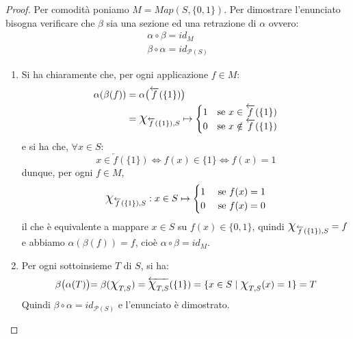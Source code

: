 \begin{proof}
	Per comodità poniamo $M=Map(S,\{0,1\})$. Per dimostrare l'enunciato bisogna verificare che $\beta$ sia una sezione ed una retrazione di $\alpha$ ovvero:
	\begin{displaymath}
		\begin{array}{l}
			\alpha \circ \beta = id_{M}\\
			\beta \circ \alpha = id_{\mathcal{P}(S)}
		\end{array}
	\end{displaymath}
	\begin{enumerate}
		\item Si ha chiaramente che, per ogni applicazione $f \in M$:
		\begin{align*}
			\alpha(\beta(f)) &=\alpha\bigl(\overleftarrow{f}(\{1\})\bigl) \\
			& = \mbox{\Large$\chi$}_{\overleftarrow{f}(\{1\}),S} \mapsto \begin{cases}
				1 & \text{se } x \in \overleftarrow{f}(\{1\})\\
				0 & \text{se } x \notin \overleftarrow{f}(\{1\})
			\end{cases}
		\end{align*}
		e si ha che, $\forall x \in S$:
		\begin{displaymath}
			x \in \overleftarrow{f}(\{1\}) \iff f(x) \in \{1\} \iff f(x)=1
		\end{displaymath}
		dunque, per ogni $f \in M$,
		\[\mbox{\Large$\chi$}_{\overleftarrow{f}(\{1\}),S}: x \in S \mapsto \begin{cases}
			1 & \text{ se } f(x) = 1 \\
			0 & \text{ se } f(x) = 0 \\
		\end{cases}
		\]
		il che è equivalente a mappare $x \in S$ su $f(x) \in \{0,1\}$, quindi $\mbox{\Large$\chi$}_{\overleftarrow{f}(\{1\}),S} = f$ e abbiamo $\alpha(\beta(f)) = f$, cioè $\alpha \circ \beta= id_{M}$.
		\item Per ogni sottoinsieme $T$ di $S$, si ha:
		\begin{align*}
			\beta\bigl(\alpha(T)\bigl) = \beta(\mbox{\Large$\chi$}_{T,S}) = \overleftarrow{\mbox{\Large$\chi$}_{T,S}}(\{1\}) = \{x \in S \; | \; \mbox{\Large$\chi$}_{T,S}(x) = 1\} = T
		\end{align*}
		Quindi $\beta \circ \alpha = id_{\mathcal{P}(S)}$ e l'enunciato è dimostrato. 
	\end{enumerate}
\end{proof}


